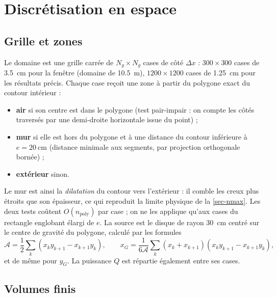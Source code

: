 \documentclass[11pt,a4paper]{article}
\theoremstyle{definition}
\theoremstyle{remark}
\newcommand{\dx}{\Delta x}
\begin{document}
\section{Discrétisation en espace}\label{sec-espace}

\subsection{Grille et zones}

Le domaine est une grille carrée de $N_g\times N_g$ cases de côté $\dx$ : $300\times300$
cases de \qty{3,5}{\centi\metre} pour la fenêtre (domaine de \qty{10,5}{\metre}),
$1200\times1200$ cases de \qty{1,25}{\centi\metre} pour les résultats précis.
Chaque case reçoit une zone à partir du polygone exact du contour intérieur :
\begin{itemize}
  \item \textbf{air} si son centre est dans le polygone (test pair-impair : on compte
  les côtés traversés par une demi-droite horizontale issue du point) ;
  \item \textbf{mur} si elle est hors du polygone et à une distance du contour
  inférieure à $e = \qty{20}{\centi\metre}$ (distance minimale aux segments,
  par projection orthogonale bornée) ;
  \item \textbf{extérieur} sinon.
\end{itemize}
Le mur est ainsi la \emph{dilatation} du contour vers l'extérieur : il comble les
creux plus étroits que son épaisseur, ce qui reproduit la limite physique de la
\cref{sec-nmax}. Les deux tests coûtent $O(n_{\mathrm{poly}})$ par case ; on ne les
applique qu'aux cases du rectangle englobant élargi de $e$. La source est le disque
de rayon \qty{30}{\centi\metre} centré sur le centre de gravité du polygone, calculé
par les formules
\[
\mathcal{A} = \frac12\sum_k (x_k y_{k+1} - x_{k+1}y_k),\qquad
x_G = \frac{1}{6\mathcal{A}}\sum_k (x_k + x_{k+1})(x_k y_{k+1} - x_{k+1}y_k),
\]
et de même pour $y_G$. La puissance $Q$ est répartie également entre ses cases.

\subsection{Volumes finis}
\end{document}
